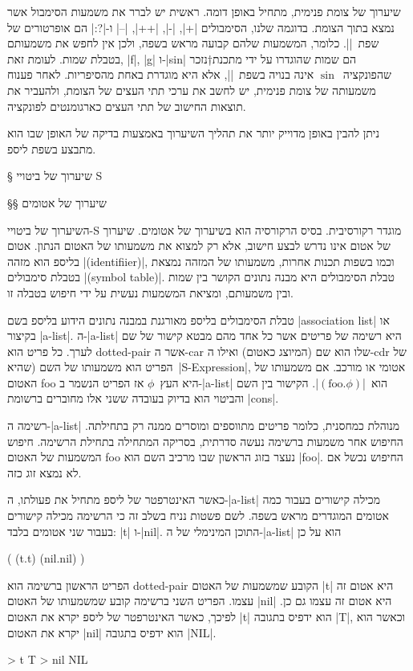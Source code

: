 שיערוך של צומת פנימית, מתחיל באופן דומה. ראשית יש לברר את משמעות הסימבול אשר
נמצא בתוך הצומת. בדוגמה שלנו, הסימבולים \T|+|, \T|-|, \T|++|, \T|--| ו-\T|?:|
הם אופרטורים של שפת~\E|\CPL|. כלומר, המשמעות שלהם קבועה מראש בשפה, ולכן אין לחפש את
משמעותם בטבלת שמות. לעומת זאת, \T|f|, \T|g| ו-\T|sin| הם שמות שהוגדרו על ידי
מתכנת†{נזכר שהפונקציה~$\sin$ אינה בנויה בשפת~\E|\CPL|, אלא היא מוגדרת באחת
מהסיפריות.} לאחר פענוח משמעותה של צומת פנימית, יש לחשב את ערכי תתי העצים של
הצומת, ולהעביר את תוצאות החישוב של תתי העצים כארגומנטים לפונקציה.

ניתן להבין באופן מדוייק יותר את תהליך השיערוך באמצעות בדיקה של האופן שבו הוא
מתבצע בשפת ליספ.

§ שיערוך של ביטויי S

§§ שיערוך של אטומים

השיערוך של ביטויי-S מוגדר רקורסיבית. בסיס הרקורסיה הוא בשיערוך של אטומים.
שיערוך של אטום אינו נדרש לבצע חישוב, אלא רק למצוא את משמעותו של האטום הנתון.
אטום בליספ הוא מזהה \E|(identifiier)|, וכמו בשפות תכנות אחרות, משמעותו של המזהה
נמצאת בטבלת סימבולים \E|(symbol table)|. טבלת הסימבולים היא מבנה נתונים הקושר בין
שמות ובין משמעותם, ומציאת המשמעות נעשית על ידי חיפוש בטבלה זו.

טבלת הסימבולים בליספ מאורגנת במבנה נתונים הידוע בליספ בשם \E|association list| או
בקיצור \E|a-list|. ה-\E|a-list| היא רשימה של פריטים אשר כל אחד מהם מבטא קישור
של שם לערך. כל פריט הוא dotted-pair אשר ה-car שלו הוא שם
(המיוצג כאטום) ואילו ה-cdr של הפריט הוא משמעותו של השם (שהיא~\E|S-Expression|,
אטומי או מורכב. אם משמעותו של האטום foo היא העץ~$ϕ$ אז הפריט הנשמר ב-\E|a-list|
הוא~\E|$(\text{foo}.ϕ)$|. הקישור בין השם והביטוי הוא בדיוק בעובדה ששני אלו מחוברים
ברשומת \E|cons|.

רשימה ה-\E|a-list| מנוהלת כמחסנית, כלומר פריטים מתווספים ומוסרים ממנה רק
בתחילתה. החיפוש אחר משמעות ברשימה נעשה סדרתית, בסריקה המתחילה בתחילת הרשימה.
חיפוש המשמעות של האטום foo נעצר בזוג הראשון שבו מרכיב השם הוא \E|foo|. החיפוש
נכשל אם לא נמצא זוג כזה.

כאשר האינטרפטר של ליספ מתחיל את פעולתו, ה-\E|a-list| מכילה קישורים בעבור כמה
אטומים המוגדרים מראש בשפה. לשם פשטות נניח בשלב זה כי הרשימה מכילה קישורים בעבור
שני אטומים בלבד: \E|t| ו-\E|nil|.
התוכן המינימלי של ה-\E|a-list| הוא על כן
\begin{LISP}
(
  (t.t)
  (nil.nil)
)
\end{LISP}

הפריט הראשון ברשימה הוא dotted-pair הקובע שמשמעות של האטום \T|t| היא אטום זה
עצמו. הפריט השני ברשימה קובע שמשמעותו של האטום \T|nil| היא אטום זה עצמו גם כן.
לפיכך, כאשר האינטרפטר של ליספ יקרא את האטום \T|t| הוא ידפיס בתגובה \T|T|, וכאשר
הוא יקרא את האטום \T|nil| הוא ידפיס בתגובה \T|NIL|.
\begin{LISP}
> t
T
> nil
NIL
\end{LISP}

